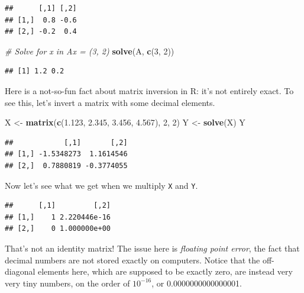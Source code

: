 \documentclass[12pt,oneside,openany]{book}
\newenvironment{Shaded}{\begin{snugshade}}{\end{snugshade}}
\newcommand{\KeywordTok}[1]{\textcolor[rgb]{0.13,0.29,0.53}{\textbf{#1}}}
\newcommand{\DecValTok}[1]{\textcolor[rgb]{0.00,0.00,0.81}{#1}}
\newcommand{\FloatTok}[1]{\textcolor[rgb]{0.00,0.00,0.81}{#1}}
\newcommand{\StringTok}[1]{\textcolor[rgb]{0.31,0.60,0.02}{#1}}
\newcommand{\CommentTok}[1]{\textcolor[rgb]{0.56,0.35,0.01}{\textit{#1}}}
\newcommand{\OperatorTok}[1]{\textcolor[rgb]{0.81,0.36,0.00}{\textbf{#1}}}
\newcommand{\NormalTok}[1]{#1}
\begin{document}
\begin{verbatim}
##      [,1] [,2]
## [1,]  0.8 -0.6
## [2,] -0.2  0.4
\end{verbatim}

\begin{Shaded}
\begin{Highlighting}[]
\CommentTok{# Solve for x in Ax = (3, 2)}
\KeywordTok{solve}\NormalTok{(A, }\KeywordTok{c}\NormalTok{(}\DecValTok{3}\NormalTok{, }\DecValTok{2}\NormalTok{))}
\end{Highlighting}
\end{Shaded}

\begin{verbatim}
## [1] 1.2 0.2
\end{verbatim}

Here is a not-so-fun fact about matrix inversion in R: it's not entirely
exact. To see this, let's invert a matrix with some decimal elements.

\begin{Shaded}
\begin{Highlighting}[]
\NormalTok{X <-}\StringTok{ }\KeywordTok{matrix}\NormalTok{(}\KeywordTok{c}\NormalTok{(}\FloatTok{1.123}\NormalTok{, }\FloatTok{2.345}\NormalTok{, }\FloatTok{3.456}\NormalTok{, }\FloatTok{4.567}\NormalTok{), }\DecValTok{2}\NormalTok{, }\DecValTok{2}\NormalTok{)}
\NormalTok{Y <-}\StringTok{ }\KeywordTok{solve}\NormalTok{(X)}
\NormalTok{Y}
\end{Highlighting}
\end{Shaded}

\begin{verbatim}
##            [,1]       [,2]
## [1,] -1.5348273  1.1614546
## [2,]  0.7880819 -0.3774055
\end{verbatim}

Now let's see what we get when we multiply \texttt{X} and \texttt{Y}.

\begin{Shaded}
\end{Shaded}

\begin{verbatim}
##      [,1]         [,2]
## [1,]    1 2.220446e-16
## [2,]    0 1.000000e+00
\end{verbatim}

That's not an identity matrix! The issue here is \emph{floating point
error}, the fact that decimal numbers are not stored exactly on
computers. Notice that the off-diagonal elements here, which are
supposed to be exactly zero, are instead very very tiny numbers, on the
order of \(10^{-16}\), or 0.0000000000000001.
\end{document}
